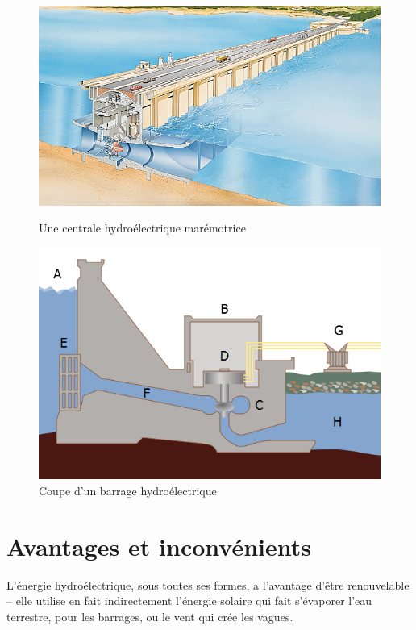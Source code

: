 \documentclass[12pt,a4paper,oneside,openany]{memoir}
\begin{document}
\begin{figure}[h]
	\centering\hspace*{-5mm}
	\begin{minipage}{.5\textwidth}
		\centering
		\includegraphics[width=\linewidth]{img/maremotrice}
		\caption{Une centrale hydroélectrique marémotrice}
		\label{fig:maremotrice}
	\end{minipage}%
	\hspace*{1cm}
	\begin{minipage}{.5\textwidth}
		\centering
		\includegraphics[width=\linewidth]{img/barrage_coupe}
		\caption{Coupe d'un barrage hydroélectrique}
		\label{fig:barrage_coupe}
	\end{minipage}
\end{figure}

\section{Avantages et inconvénients}
L'énergie hydroélectrique, sous toutes ses formes, a l'avantage d'être renouvelable -- elle utilise en fait indirectement l'énergie solaire qui fait s'évaporer l'eau terrestre, pour les barrages, ou le vent qui crée les vagues.
\end{document}
